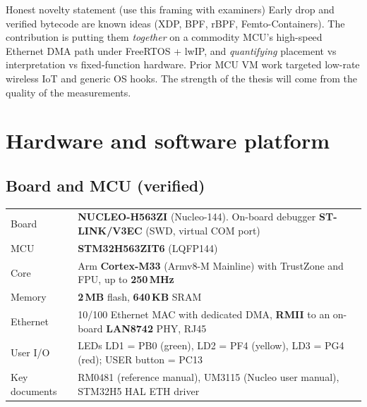 \documentclass[10pt,a4paper]{article}
\begin{document}
\begin{keybox}{Honest novelty statement (use this framing with examiners)}
Early drop and verified bytecode are known ideas (XDP, BPF, rBPF, Femto-Containers). The contribution is putting them \emph{together} on a commodity MCU's high-speed Ethernet DMA path under FreeRTOS + lwIP, and \emph{quantifying} placement vs interpretation vs fixed-function hardware. Prior MCU VM work targeted low-rate wireless IoT and generic OS hooks. The strength of the thesis will come from the quality of the measurements.
\end{keybox}

\section{Hardware and software platform}
\subsection{Board and MCU (verified)}
\begin{tabularx}{\textwidth}{@{}P{4.1cm}L@{}}
\toprule
Board & \textbf{NUCLEO-H563ZI} (Nucleo-144). On-board debugger \textbf{ST-LINK/V3EC} (SWD, virtual COM port) \\
MCU & \textbf{STM32H563ZIT6} (LQFP144) \\
Core & Arm \textbf{Cortex-M33} (Armv8-M Mainline) with TrustZone and FPU, up to \textbf{250\,MHz} \\
Memory & \textbf{2\,MB} flash, \textbf{640\,KB} SRAM \\
Ethernet & 10/100 Ethernet MAC with dedicated DMA, \textbf{RMII} to an on-board \textbf{LAN8742} PHY, RJ45 \\
User I/O & LEDs LD1 = PB0 (green), LD2 = PF4 (yellow), LD3 = PG4 (red); USER button = PC13 \\
Key documents & RM0481 (reference manual), UM3115 (Nucleo user manual), STM32H5 HAL ETH driver \\
\bottomrule
\end{tabularx}
\end{document}
